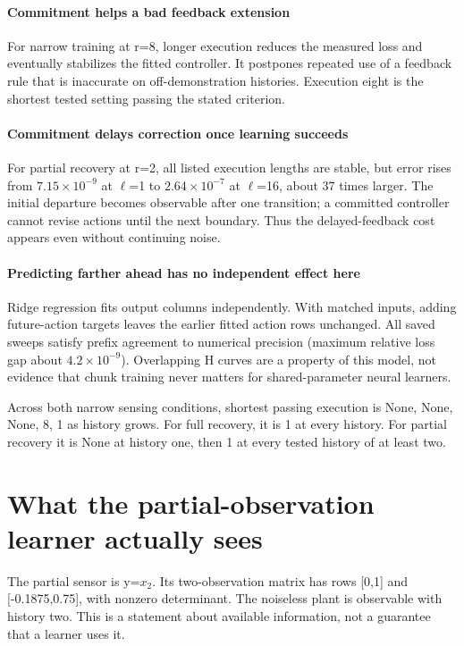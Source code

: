 \documentclass{l4dc2026}
\begin{document}
\paragraph{Commitment helps a bad feedback extension}
For narrow training at r=8, longer execution reduces the measured loss and eventually stabilizes the fitted controller. It postpones repeated use of a feedback rule that is inaccurate on off-demonstration histories. Execution eight is the shortest tested setting passing the stated criterion.

\paragraph{Commitment delays correction once learning succeeds}
For partial recovery at r=2, all listed execution lengths are stable, but error rises from $7.15\times10^{-9}$ at $\ell$=1 to $2.64\times10^{-7}$ at $\ell$=16, about 37 times larger. The initial departure becomes observable after one transition; a committed controller cannot revise actions until the next boundary. Thus the delayed-feedback cost appears even without continuing noise.

\paragraph{Predicting farther ahead has no independent effect here}
Ridge regression fits output columns independently. With matched inputs, adding future-action targets leaves the earlier fitted action rows unchanged. All saved sweeps satisfy prefix agreement to numerical precision (maximum relative loss gap about $4.2\times10^{-9}$). Overlapping H curves are a property of this model, not evidence that chunk training never matters for shared-parameter neural learners.

{\small Across both narrow sensing conditions, shortest passing execution is None, None, None, 8, 1 as history grows. For full recovery, it is 1 at every history. For partial recovery it is None at history one, then 1 at every tested history of at least two.\par}

\section{What the partial-observation learner actually sees}
The partial sensor is y=$x_2$. Its two-observation matrix has rows [0,1] and [-0.1875,0.75], with nonzero determinant. The noiseless plant is observable with history two. This is a statement about available information, not a guarantee that a learner uses it.
\end{document}
